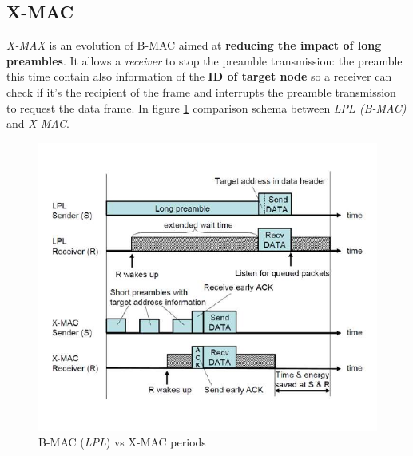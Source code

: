 \documentclass[10pt,a4paper]{report}
\theoremstyle{definition}
\begin{document}
\subsection{X-MAC}\label{sec:x-mac}
\textit{X-MAX} is an evolution of B-MAC aimed at \textbf{reducing the impact of long preambles}.
It allows a \textit{receiver} to stop the preamble transmission: the preamble this time contain also information of the \textbf{ID of target node} so a receiver can check if it's the recipient of the frame and interrupts the preamble transmission to request the data frame.
In figure \ref{xmac-schema} comparison schema between \textit{LPL (B-MAC)} and \textit{X-MAC}.
\begin{figure}[h!]
	\centering\includegraphics[scale=0.60]{images/Pasted image 20230409090007.png}
	\caption{B-MAC (\textit{LPL}) vs X-MAC periods}
	\label{xmac-schema}
\end{figure}
\end{document}
